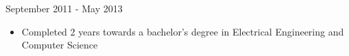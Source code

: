 \documentclass{resume}
\begin{document}
\begin{spacing}{1.2}
\begin{paracol}{2}
	\bigskip
	\bigskip

	\small {}

	\medskip

	{\large{}}
	\hfill{September 2011 - May 2013}

	\nointerlineskip
	\begin{itemize}
		\item Completed 2 years towards a bachelor's degree in Electrical Engineering and Computer Science
	\end{itemize}
\end{paracol}

\end{spacing}
\end{document}
